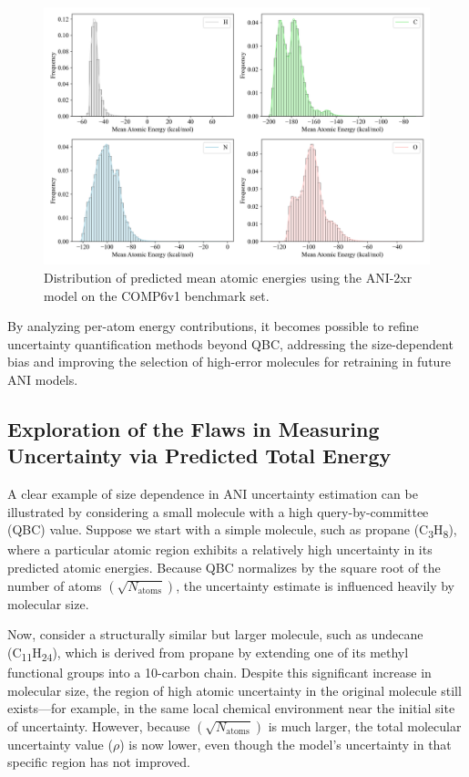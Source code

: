 \begin{figure}[H]
    \centering
    \includegraphics[width=1\linewidth]{Images/2xr_outputs/2xr_comp6v1_mean-ae-per-atomtype.png}
    \caption[Mean atomic energy prediction per-atom with ANI-2xr]{Distribution of predicted mean atomic energies using the ANI-2xr model on the COMP6v1 benchmark set.}
    \label{fig:2xr_comp6v1_mean-ae-per-atomtype}
\end{figure}

By analyzing per-atom energy contributions, it becomes possible to refine uncertainty quantification methods beyond QBC, addressing the size-dependent bias and improving the selection of high-error molecules for retraining in future ANI models.

\subsection{Exploration of the Flaws in Measuring Uncertainty via Predicted Total Energy}
\label{subsec:flaws_in_qbc}

A clear example of size dependence in ANI uncertainty estimation can be illustrated by considering a small molecule with a high query-by-committee (QBC) value. Suppose we start with a simple molecule, such as propane (C\textsubscript{3}H\textsubscript{8}), where a particular atomic region exhibits a relatively high uncertainty in its predicted atomic energies. Because QBC normalizes by the square root of the number of atoms $\left(\sqrt{N_\text{atoms}} \right)$, the uncertainty estimate is influenced heavily by molecular size.

Now, consider a structurally similar but larger molecule,  such as undecane (C\textsubscript{11}H\textsubscript{24}), which is derived from propane by extending one of its methyl functional groups into a 10-carbon chain. Despite this significant increase in molecular size, the region of high atomic uncertainty in the original molecule still exists—for example, in the same local chemical environment near the initial site of uncertainty. However, because $\left(\sqrt{N_\text{atoms}} \right)$ is much larger, the total molecular uncertainty value ($\rho$) is now lower, even though the model's uncertainty in that specific region has not improved.

